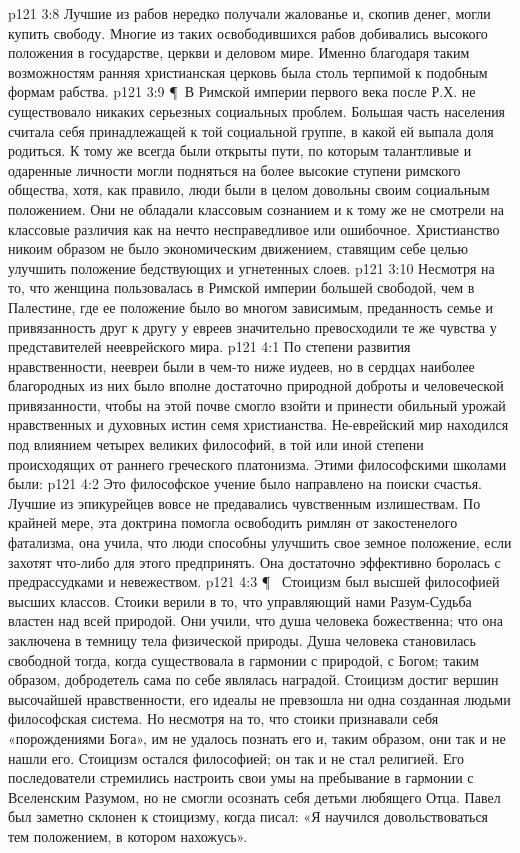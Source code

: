\vs p121 3:8 Лучшие из рабов нередко получали жалованье и, скопив денег, могли купить свободу. Многие из таких освободившихся рабов добивались высокого положения в государстве, церкви и деловом мире. Именно благодаря таким возможностям ранняя христианская церковь была столь терпимой к подобным формам рабства.
\vs p121 3:9 \P\ В Римской империи первого века после Р.Х. не существовало никаких серьезных социальных проблем. Большая часть населения считала себя принадлежащей к той социальной группе, в какой ей выпала доля родиться. К тому же всегда были открыты пути, по которым талантливые и одаренные личности могли подняться на более высокие ступени римского общества, хотя, как правило, люди были в целом довольны своим социальным положением. Они не обладали классовым сознанием и к тому же не смотрели на классовые различия как на нечто несправедливое или ошибочное. Христианство никоим образом не было экономическим движением, ставящим себе целью улучшить положение бедствующих и угнетенных слоев.
\vs p121 3:10 Несмотря на то, что женщина пользовалась в Римской империи большей свободой, чем в Палестине, где ее положение было во многом зависимым, преданность семье и привязанность друг к другу у евреев значительно превосходили те же чувства у представителей нееврейского мира.
\vs p121 4:1 По степени развития нравственности, неевреи были в чем\hyp{}то ниже иудеев, но в сердцах наиболее благородных из них было вполне достаточно природной доброты и человеческой привязанности, чтобы на этой почве смогло взойти и принести обильный урожай нравственных и духовных истин семя христианства. Не\hyp{}еврейский мир находился под влиянием четырех великих философий, в той или иной степени происходящих от раннего греческого платонизма. Этими философскими школами были:
\vs p121 4:2 \bibnobreakspace {} Это философское учение было направлено на поиски счастья. Лучшие из эпикурейцев вовсе не предавались чувственным излишествам. По крайней мере, эта доктрина помогла освободить римлян от закостенелого фатализма, она учила, что люди способны улучшить свое земное положение, если захотят что\hyp{}либо для этого предпринять. Она достаточно эффективно боролась с предрассудками и невежеством.
\vs p121 4:3 \P\ \bibnobreakspace {} Стоицизм был высшей философией высших классов. Стоики верили в то, что управляющий нами Разум\hyp{}Судьба властен над всей природой. Они учили, что душа человека божественна; что она заключена в темницу тела физической природы. Душа человека становилась свободной тогда, когда существовала в гармонии с природой, с Богом; таким образом, добродетель сама по себе являлась наградой. Стоицизм достиг вершин высочайшей нравственности, его идеалы не превзошла ни одна созданная людьми философская система. Но несмотря на то, что стоики признавали себя «порождениями Бога», им не удалось познать его и, таким образом, они так и не нашли его. Стоицизм остался философией; он так и не стал религией. Его последователи стремились настроить свои умы на пребывание в гармонии с Вселенским Разумом, но не смогли осознать себя детьми любящего Отца. Павел был заметно склонен к стоицизму, когда писал: «Я научился довольствоваться тем положением, в котором нахожусь».
